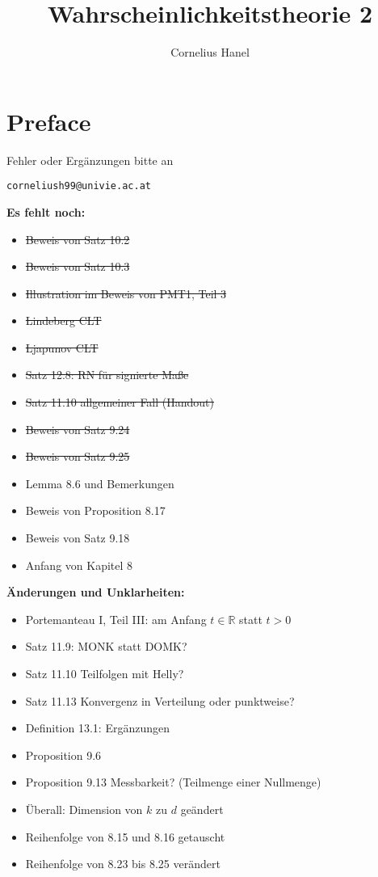 \documentclass[11pt]{report}
\title{Wahrscheinlichkeitstheorie 2}
\author{Cornelius Hanel}
\begin{document}
\maketitle

\chapter*{Preface}
Fehler oder Erg\"anzungen bitte an
\newline
\begin{center}
    \texttt{corneliush99@univie.ac.at}
\end{center}

\textbf{Es fehlt noch:}
\begin{multicols}{2}
\begin{itemize}
    \item \sout{Beweis von Satz 10.2} \checkmark
    \item \sout{Beweis von Satz 10.3} \checkmark
    \item \sout{Illustration im Beweis von PMT1, Teil 3} \checkmark 
    \item \sout{Lindeberg CLT} \checkmark
    \item \sout{Ljapunov CLT} \checkmark
    \item \sout{Satz 12.8: R\textendash N f\"ur signierte Ma\ss{}e} \checkmark
    \item \sout{Satz 11.10 allgemeiner Fall (Handout)} \checkmark
    \item \sout{Beweis von Satz 9.24} \checkmark
    \item \sout{Beweis von Satz 9.25} \checkmark
    \item Lemma 8.6 und Bemerkungen
    \item Beweis von Proposition 8.17
    \item Beweis von Satz 9.18
    \item Anfang von Kapitel 8
\end{itemize}
\end{multicols}

\textbf{\"Anderungen und Unklarheiten:}
\begin{multicols}{2}
\begin{itemize}
    \item Portemanteau I, Teil III: am Anfang $t\in\mathbb{R}$ statt $t>0$
    \item Satz 11.9: MONK statt DOMK?
    \item Satz 11.10 Teilfolgen mit Helly?
    \item Satz 11.13 Konvergenz in Verteilung oder punktweise?
    \item Definition 13.1: Erg\"anzungen
    \item Proposition 9.6
    \item Proposition 9.13 Messbarkeit? (Teilmenge einer Nullmenge)
    \item \"Uberall: Dimension von $k$ zu $d$ ge\"andert
    \item Reihenfolge von 8.15 und 8.16 getauscht
    \item Reihenfolge von 8.23 bis 8.25 ver\"andert
\end{itemize}
\end{multicols}
\end{document}
